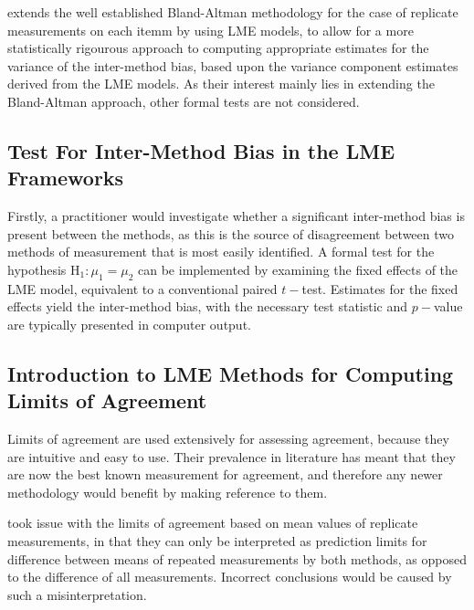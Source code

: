 \documentclass[12pt, a4paper]{report}
\theoremstyle{plain}
\theoremstyle{definition}
\theoremstyle{remark}
\begin{document}
\citet{BXC2008} extends the well established Bland-Altman methodology for the case of replicate measurements on each itemm by using LME models, to allow for a more statistically rigourous approach to computing appropriate estimates for the variance of the inter-method bias, based upon the variance component estimates derived from the LME models. As their interest mainly lies in extending the Bland-Altman approach, other formal tests are not considered.  





\subsection{Test For Inter-Method Bias in the LME Frameworks}
Firstly, a practitioner would investigate whether a significant inter-method bias is present between the methods, as this is the source of disagreement between two methods of measurement that is most easily identified. A formal test for the hypothesis $\operatorname{H_1} : \mu_1 = \mu_2$ can be implemented by examining the fixed effects of the LME model, equivalent to a conventional paired $t-$test. Estimates for the fixed effects yield the inter-method bias, with the necessary test statistic and $p-$value are typically presented in computer output. 
\subsection{Introduction to LME Methods for Computing Limits of Agreement}

Limits of agreement are used extensively for assessing agreement, because they are intuitive and easy to use. Their prevalence in literature has meant that they are now the best known measurement for agreement, and therefore any newer methodology would benefit by making reference to them.



\citet{BXC2008} took issue with the limits of agreement based on mean values of replicate measurements, in that they can only be interpreted as prediction limits for difference between means of repeated measurements by both methods, as opposed to the difference of all measurements.
Incorrect conclusions would be caused by such a misinterpretation.
\end{document}
